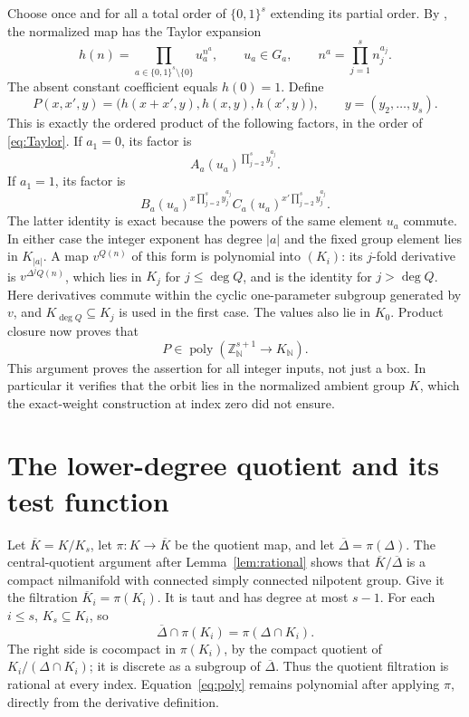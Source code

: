 \documentclass[11pt]{article}
\newcommand{\Z}{\mathbb Z}
\newcommand{\N}{\mathbb N}
\newcommand{\poly}{\operatorname{poly}}
\begin{document}
Choose once and for all a total order of $\{0,1\}^s$ extending its partial
order. By \cite[Lemma B.9]{GTZ}, the normalized map has the Taylor expansion
\begin{equation}\label{eq:Taylor}
 h(n)=\prod_{a\in\{0,1\}^s\setminus\{0\}} u_a^{n^a},
 \qquad u_a\in G_a,\qquad n^a=\prod_{j=1}^s n_j^{a_j}.
\end{equation}
The absent constant coefficient equals $h(0)=1$. Define
\[
 P(x,x',y)=
 \bigl(h(x+x',y),h(x,y),h(x',y)\bigr),\qquad
 y=(y_2,\ldots,y_s).
\]
This is exactly the ordered product of the following factors, in the order
of \eqref{eq:Taylor}. If $a_1=0$, its factor is
\[
 A_a(u_a)^{\prod_{j=2}^s y_j^{a_j}}.
\]
If $a_1=1$, its factor is
\[
 B_a(u_a)^{x\prod_{j=2}^s y_j^{a_j}}
 C_a(u_a)^{x'\prod_{j=2}^s y_j^{a_j}}.
\]
The latter identity is exact because the powers of the same element $u_a$
commute. In either case the integer exponent has degree $|a|$ and the fixed
group element lies in $K_{|a|}$. A map $v^{Q(n)}$ of this form is polynomial
into $(K_i)$: its $j$-fold derivative is $v^{\Delta^j Q(n)}$, which lies in
$K_j$ for $j\leq\deg Q$, and is the identity for $j>\deg Q$.
Here derivatives commute within the cyclic one-parameter subgroup generated
by $v$, and $K_{\deg Q}\subseteq K_j$ is used in the first case.
The values also lie in $K_0$. Product closure
\cite[Corollary B.4]{GTZ} now proves that
\begin{equation}\label{eq:poly}
 P\in\poly(\Z^{s+1}_{\N}\longrightarrow K_{\N}).
\end{equation}
This argument proves the assertion for all integer inputs, not just a box.
In particular it verifies that the orbit lies in the normalized ambient
group $K$, which the exact-weight construction at index zero did not ensure.

\section{The lower-degree quotient and its test function}

Let $\overline K=K/K_s$, let $\pi:K\longrightarrow\overline K$ be the
quotient map, and let $\overline\Delta=\pi(\Delta)$.
The central-quotient argument after Lemma~\ref{lem:rational} shows that
$\overline K/\overline\Delta$ is a compact nilmanifold with connected simply
connected nilpotent group. Give it the filtration
$\overline K_i=\pi(K_i)$. It is taut and has degree at most $s-1$.
For each $i\leq s$, $K_s\subseteq K_i$, so
\[
 \overline\Delta\cap\pi(K_i)=\pi(\Delta\cap K_i).
\]
The right side is cocompact in $\pi(K_i)$, by the compact quotient of
$K_i/(\Delta\cap K_i)$; it is discrete as a subgroup of
$\overline\Delta$. Thus the quotient filtration is rational at every index.
Equation~\eqref{eq:poly} remains polynomial after applying $\pi$, directly
from the derivative definition.
\end{document}
